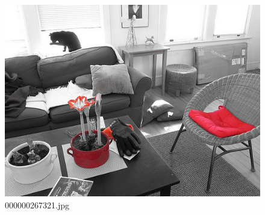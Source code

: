 \begin{figure}[h]
    \centering
    \includegraphics[width=0.8\linewidth]{../image set/hard/000000267321.jpg}
    \caption{000000267321.jpg}
\end{figure}
